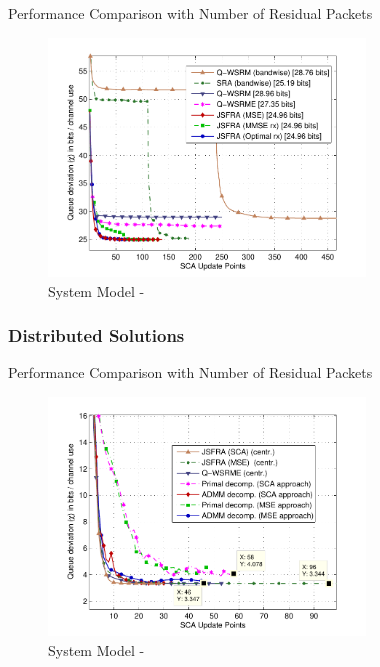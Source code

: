 \documentclass[10pt]{beamer}
\begin{document}
\begin{frame}{Performance Comparison with Number of Residual Packets}
\begin{figure}
	\centering
	\includegraphics[width=0.75\textwidth]{fig-2-5}
	\caption{System Model - }
\end{figure}
\end{frame}

\subsubsection{Distributed Solutions}

\begin{frame}{Performance Comparison with Number of Residual Packets}
	\begin{figure}
		\centering
		\includegraphics[width=0.75\textwidth]{fig-3-2}
		\caption{System Model - }
	\end{figure}
\end{frame}
\end{document}
